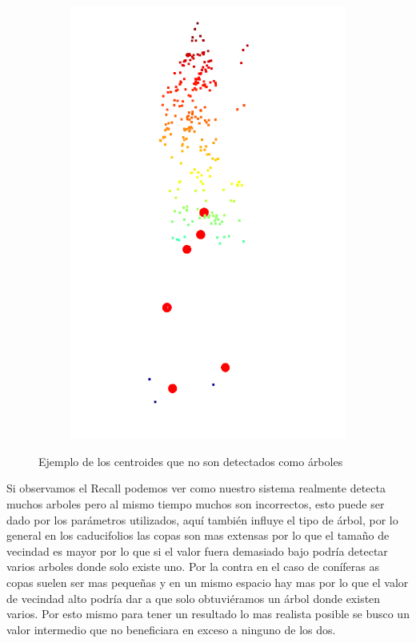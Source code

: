 \begin{figure}
\begin{subfigure}{0.5\textwidth}
    \includegraphics[width=0.8\linewidth]{imaxes/resdetec2fallido.png}
  \end{subfigure}
 \caption{Ejemplo de los centroides que no son detectados como árboles}
  \label{fig:centroidesAnaF}
\end{figure}


Si observamos el Recall podemos ver como nuestro sistema realmente detecta muchos arboles pero al mismo tiempo muchos son incorrectos, esto puede ser dado por los parámetros utilizados, aquí también influye el tipo de árbol, por lo general en los caducifolios las copas son mas extensas por lo que el tamaño de vecindad es mayor por lo que si el valor fuera demasiado bajo podría detectar varios arboles donde solo existe uno. Por la contra en el caso de coníferas as copas suelen ser mas pequeñas y en un mismo espacio hay mas por lo que el valor de vecindad alto podría dar a que solo obtuviéramos un árbol donde existen varios. Por esto mismo para tener un resultado lo mas realista posible se busco un valor intermedio que no beneficiara en exceso a ninguno de los dos.


